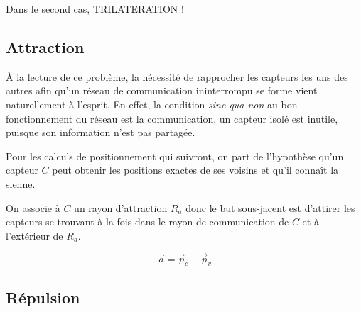 \documentclass[10pt]{article}
\newcommand{\drawSensor}[4]{
  \draw[fill=#4] (#1,#2) circle (0.1);
  \draw[dashed,#4] (#1,#2) circle (#3);
}
\begin{document}
\begin{multicols}{2}
Dans le second cas, TRILATERATION !

\subsection{Attraction}

\`A la lecture de ce problème, la nécessité de rapprocher les capteurs
les uns des autres afin qu'un réseau de communication ininterrompu se
forme vient naturellement à l'esprit. En effet, la condition
\textit{sine qua non} au bon fonctionnement du réseau est la
communication, un capteur isolé est inutile, puisque son information
n'est pas partagée.

Pour les calculs de positionnement qui suivront, on part de
l'hypothèse qu'un capteur $C$ peut obtenir les positions exactes de
ses voisins et qu'il connaît la sienne.

On associe à $C$ un rayon d'attraction $R_a$ donc le but sous-jacent
est d'attirer les capteurs se trouvant à la fois dans le rayon de
communication de $C$ et à l'extérieur de $R_a$.

\begin{figure}[H]

  \centering


  \caption{}
  \label{}

\end{figure}

$$
\vec{a} = \vec{p}_c - \vec{p}_v
$$

\subsection{Répulsion}

\begin{figure}[H]

  \centering

\end{figure}
\end{multicols}
\end{document}
